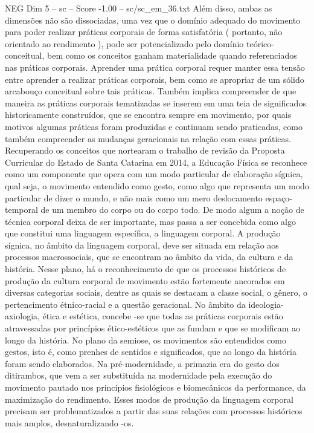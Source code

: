 \begin{textsample}{NEG Dim 5 – sc – Score -1.00 – sc/sc\_em\_36.txt}
Além disso, ambas as dimensões não são dissociadas, uma vez que o domínio adequado do movimento para poder realizar práticas corporais de forma satisfatória ( portanto, não orientado ao rendimento ), pode ser potencializado pelo domínio teórico-conceitual, bem como os conceitos ganham materialidade quando referenciados nas práticas corporais.
Aprender uma prática corporal requer manter essa tensão entre aprender a realizar práticas corporais, bem como se apropriar de um sólido arcabouço conceitual sobre tais práticas.
Também implica compreender de que maneira as práticas corporais tematizadas se inserem em uma teia de significados historicamente construídos, que se encontra sempre em movimento, por quais motivos algumas práticas foram produzidas e continuam sendo praticadas, como também compreender as mudanças geracionais na relação com essas práticas.
Recuperando os conceitos que nortearam o trabalho de revisão da Proposta Curricular do Estado de Santa Catarina em 2014, a Educação Física se reconhece como um componente que opera com um modo particular de elaboração sígnica, qual seja, o movimento entendido como gesto, como algo que representa um modo particular de dizer o mundo, e não mais como um mero deslocamento espaço-temporal de um membro do corpo ou do corpo todo.
De modo algum a noção de técnica corporal deixa de ser importante, mas passa a ser concebida como algo que constitui uma linguagem específica, a linguagem corporal.
A produção sígnica, no âmbito da linguagem corporal, deve ser situada em relação aos processos macrossociais, que se encontram no âmbito da vida, da cultura e da história.
Nesse plano, há o reconhecimento de que os processos históricos de produção da cultura corporal de movimento estão fortemente ancorados em diversas categorias sociais, dentre as quais se destacam a classe social, o gênero, o pertencimento étnico-racial e a questão geracional.
No âmbito da ideologia-axiologia, ética e estética, concebe -se que todas as práticas corporais estão atravessadas por princípios ético-estéticos que as fundam e que se modificam ao longo da história.
No plano da semiose, os movimentos são entendidos como gestos, isto é, como prenhes de sentidos e significados, que ao longo da história foram sendo elaborados.
Na pré-modernidade, a primazia era do gesto dos ditirambos, que vem a ser substituída na modernidade pela execução do movimento pautado nos princípios fisiológicos e biomecânicos da performance, da maximização do rendimento.
Esses modos de produção da linguagem corporal precisam ser problematizados a partir das suas relações com processos históricos mais amplos, desnaturalizando -os.

\end{textsample}
